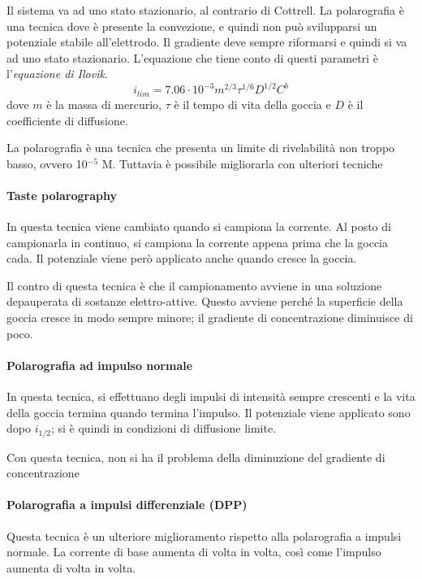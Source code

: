 Il sistema va ad uno stato stazionario, al contrario di Cottrell.
La polarografia è una tecnica dove è presente la convezione, e quindi non può svilupparsi un potenziale stabile all'elettrodo.
Il gradiente deve sempre riformarsi e quindi si va ad uno stato stazionario.
L'equazione che tiene conto di questi parametri è l'\emph{equazione di Ilovik}.
\[
i_{lim} = 7.06 \cdot 10^{-3} m^{2/3} \tau^{1/6} D^{1/2} C^b
\]
dove $m$ è la massa di mercurio, $\tau$ è il tempo di vita della goccia e $D$ è il coefficiente di diffusione.


La polarografia è una tecnica che presenta un limite di rivelabilità non troppo basso, ovvero 10$^{-5}$ M.
Tuttavia è possibile migliorarla con ulteriori tecniche

\paragraph{Taste polarography}
In questa tecnica viene cambiato quando si campiona la corrente.
Al posto di campionarla in continuo, si campiona la corrente appena prima che la goccia cada.
Il potenziale viene però applicato anche quando cresce la goccia.


Il contro di questa tecnica è che il campionamento avviene in una soluzione depauperata di sostanze elettro-attive.
Questo avviene perché la superficie della goccia cresce in modo sempre minore; il gradiente di concentrazione diminuisce di poco.

\paragraph{Polarografia ad impulso normale}
In questa tecnica, si effettuano degli impulsi di intensità sempre crescenti e la vita della goccia termina quando termina l'impulso.
Il potenziale viene applicato sono dopo $i_{1/2}$; si è quindi in condizioni di diffusione limite.


Con questa tecnica, non si ha il problema della diminuzione del gradiente di concentrazione

\paragraph{Polarografia a impulsi differenziale (DPP)}
Questa tecnica è un ulteriore miglioramento rispetto alla polarografia a impulsi normale.
La corrente di base aumenta di volta in volta, così come l'impulso aumenta di volta in volta.

